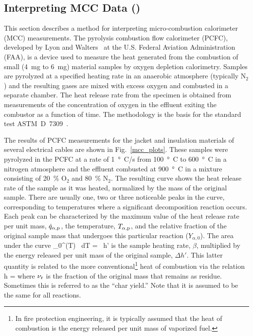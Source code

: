 \documentclass[11pt]{book}
\begin{document}
\newpage


\subsection{Interpreting MCC Data (\texorpdfstring{}{cable\_XX\_mcc})}
\label{cable_11_mcc}
\label{cable_23_insulation}
\label{cable_701_insulation}
\label{cable_11_insulation}
\label{cable_11_jacket}
\label{cable_23_jacket}
\label{cable_701_jacket}

This section describes a method for interpreting micro-combustion calorimeter (MCC) measurements. The pyrolysis combustion flow calorimeter (PCFC), developed by Lyon and Walters~\cite{Lyon:JAAP2004} at the U.S. Federal Aviation Administration (FAA), is a device used to measure the heat generated from the combustion of small (4~mg to 6~mg) material samples by oxygen depletion calorimetry. Samples are pyrolyzed at a specified heating rate in an anaerobic atmosphere (typically N$_2$) and the resulting gases are mixed with excess oxygen and combusted in a separate chamber. The heat release rate from the specimen is obtained from measurements of the concentration of oxygen in the effluent exiting the combustor as a function of time. The methodology is the basis for the standard test ASTM~D~7309~\cite{microcc}.

The results of PCFC measurements for the jacket and insulation materials of several electrical cables are shown in Fig.~\ref{mcc_plots}. These samples were pyrolyzed in the PCFC at a rate of 1~\si{\degree C}/s from 100~\si{\degree C} to 600~\si{\degree C} in a nitrogen atmosphere and the effluent combusted at 900~\si{\degree C} in a mixture consisting of 20~\% O$_2$ and 80~\% N$_2$. The resulting curve shows the heat release rate of the sample as it was heated, normalized by the mass of the original sample. There are usually one, two or three noticeable peaks in the curve, corresponding to temperatures where a significant decomposition reaction occurs. Each peak can be characterized by the maximum value of the heat release rate per unit mass, $\dot{q}_{\alpha,{\rm p}}$, the temperature, $T_{\alpha,{\rm p}}$, and the relative fraction of the original sample mass that undergoes this particular reaction ($Y_{\alpha,0}$). The area under the curve
\be
   \int_0^\infty {}(T) \, dT = \beta \, \Delta h'
\ee
is the sample heating rate, $\beta$, multiplied by the energy released per unit mass of the original sample, $\Delta h'$. This latter quantity is related to the more conventional\footnote{In fire protection engineering, it is typically assumed that the heat of combustion is the energy released per unit mass of vaporized fuel.} heat of combustion via the relation
\be
   \Delta h = 
\ee
where $\nu_{\rm r}$ is the fraction of the original mass that remains as residue. Sometimes this is referred to as the ``char yield.'' Note that it is assumed to be the same for all reactions.
\end{document}
